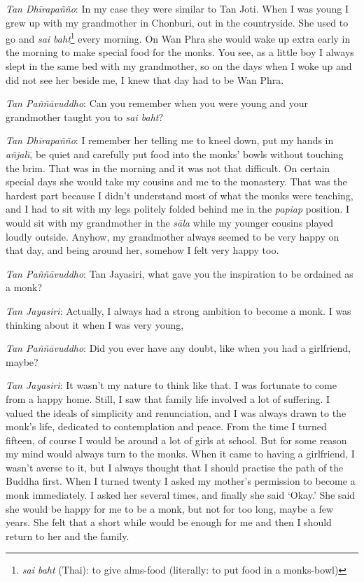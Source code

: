 \emph{Tan Dhīrapañño}: In my case they were similar to Tan Joti. When I
was young I grew up with my grandmother in Chonburi, out in the
countryside. She used to go and \emph{sai baht}\footnote{\emph{sai baht}
(Thai): to give alms-food (literally: to put food in a monks-bowl)}
every morning. On Wan Phra she would wake up extra early in the morning
to make special food for the monks. You see, as a little boy I always
slept in the same bed with my grandmother, so on the days when I woke up
and did not see her beside me, I knew that day had to be Wan Phra. 

\emph{Tan Paññāvuddho}: Can you remember when you were young and your
grandmother taught you to \emph{sai baht}? 

\emph{Tan Dhīrapañño}: I remember her telling me to kneel down, put my
hands in \emph{añjalī}, be quiet and carefully put food into the monks'
bowls without touching the brim. That was in the morning and it was not
that difficult. On certain special days she would take my cousins and me
to the monastery. That was the hardest part because I didn't understand
most of what the monks were teaching, and I had to sit with my legs
politely folded behind me in the \emph{papiap} position. I would sit
with my grandmother in the \emph{sāla} while my younger cousins played
loudly outside. Anyhow, my grandmother always seemed to be very happy on
that day, and being around her, somehow I felt very happy too. 

\emph{Tan Paññāvuddho}: Tan Jayasiri, what gave you the inspiration to
be ordained as a monk? 

\emph{Tan Jayasiri}: Actually, I always had a strong ambition to become
a monk. I was thinking about it when I was very young, 

\emph{Tan Paññāvuddho}: Did you ever have any doubt, like when you had
a girlfriend, maybe? 

\emph{Tan Jayasiri}: It wasn't my nature to think like that. I was
fortunate to come from a happy home. Still, I saw that family life
involved a lot of suffering. I valued the ideals of simplicity and
renunciation, and I was always drawn to the monk's life, dedicated to
contemplation and peace. From the time I turned fifteen, of course I
would be around a lot of girls at school. But for some reason my mind
would always turn to the monks. When it came to having a girlfriend, I
wasn't averse to it, but I always thought that I should practise the
path of the Buddha first. When I turned twenty I asked my mother's
permission to become a monk immediately. I asked her several times, and
finally she said `Okay.' She said she would be happy for me to be a
monk, but not for too long, maybe a few years. She felt that a short
while would be enough for me and then I should return to her and the
family. 

